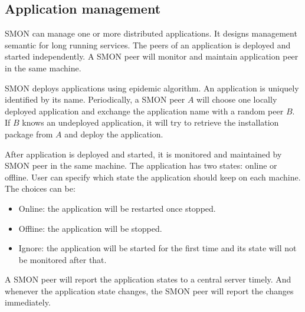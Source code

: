 \subsection{Application management}

SMON can manage one or more distributed applications. It
designs management semantic for long running services. The
peers of an application is deployed and started
independently. A SMON peer will monitor and maintain
application peer in the same machine.

SMON deploys applications using epidemic algorithm.  An
application is uniquely identified by its name.
Periodically, a SMON peer $A$ will choose one locally
deployed application and exchange the application name with
a random peer $B$. If $B$ knows an undeployed application,
it will try to retrieve the installation package from $A$
and deploy the application.



After application is deployed and started, it is monitored
and maintained by SMON peer in the same machine.  The
application has two states: online or offline.  User can
specify which state the application should keep on each
machine. The choices can be:

\begin{itemize}
  \item Online: the application will be restarted once
  stopped.
  \item Offline: the application will be stopped.
  \item Ignore: the application will be started for the
  first time and its state will not be monitored after
  that.
\end{itemize}

A SMON peer will report the application states to a central
server timely. And whenever the application state changes,
the SMON peer will report the changes immediately.

